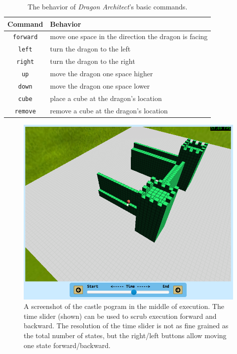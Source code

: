 \documentclass{sig-alternate}
\newcommand{\da}{\emph{Dragon Architect}}
\begin{document}
\begin{table}[ht!]
  \centering
  \begin{tabular}{|c|p{6cm}|}
    \hline
    Command & Behavior \\\hline
    \texttt{forward} & move one space in the direction the dragon is facing \\\hline
    \texttt{left} & turn the dragon to the left \\\hline
    \texttt{right} & turn the dragon to the right \\\hline
    \texttt{up} & move the dragon one space higher \\\hline
    \texttt{down} & move the dragon one space lower \\\hline
    \texttt{cube} & place a cube at the dragon's location \\\hline
    \texttt{remove} & remove a cube at the dragon's location \\\hline
  \end{tabular}
  \caption{The behavior of \da{}'s basic commands.}
  \label{tab:commands}
\end{table}

\begin{figure}[ht!]
  \centering
  \includegraphics[width=0.9\columnwidth]{images/castle-time-slider}
  \caption{A screenshot of the castle pogram in the middle of execution. The time slider (shown) can be used to scrub execution forward and backward. The resolution of the time slider is not as fine grained as the total number of states, but the right/left buttons allow moving one state forward/backward.}
  \label{fig:time-slider}
\end{figure}
\end{document}
